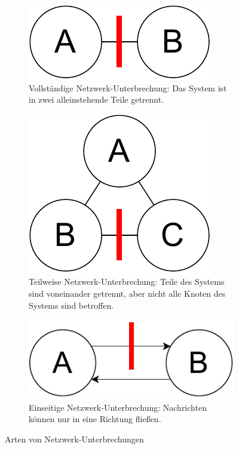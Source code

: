 \documentclass[12pt,a4paper]{report}
\begin{document}
\begin{figure}[H]
	\centering
	\begin{subfigure}{.495\textwidth}
		\centering
		\includegraphics[width=.8\linewidth]{img/ditm-Partitions-full.pdf}
		\caption{Vollständige Netzwerk-Unterbrechung: Das System ist in zwei alleinstehende Teile getrennt.
			\cite{analysis_of_network_partition_failures}}
		\label{fig:full_partition}
	\end{subfigure}
	\begin{subfigure}{.495\textwidth}
		\centering
		\includegraphics[width=.85\linewidth]{img/ditm-Partitions-partial.pdf}
		\caption{Teilweise Netzwerk-Unterbrechung: Teile des Systems sind voneinander getrennt, aber nicht alle Knoten des Systems
			sind betroffen. \cite{analysis_of_network_partition_failures}}
		\label{fig:partial_partition}
	\end{subfigure}
	\begin{subfigure}{.495\textwidth}
		\centering
		\includegraphics[width=\linewidth]{img/ditm-Partitions-simplex.pdf}
		\caption{Einseitige Netzwerk-Unterbrechung: Nachrichten können nur in eine Richtung fließen.
			\cite{analysis_of_network_partition_failures}}
		\label{fig:simplex_partition}
	\end{subfigure}
	\caption{Arten von Netzwerk-Unterbrechungen}
	\label{fig:partition_types}
\end{figure}
\end{document}
